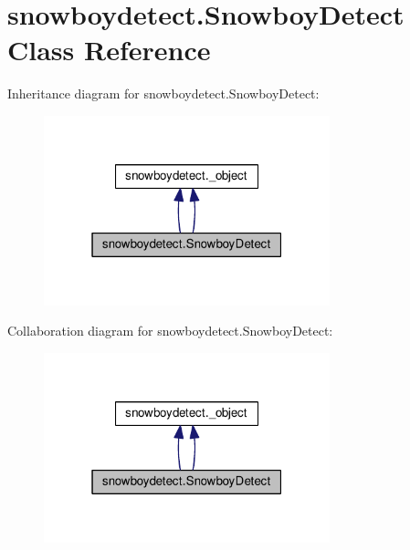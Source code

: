 \hypertarget{classsnowboydetect_1_1SnowboyDetect}{}\section{snowboydetect.\+Snowboy\+Detect Class Reference}
\label{classsnowboydetect_1_1SnowboyDetect}


Inheritance diagram for snowboydetect.\+Snowboy\+Detect\+:
\nopagebreak
\begin{figure}[H]
\begin{center}
\leavevmode
\includegraphics[width=235pt]{classsnowboydetect_1_1SnowboyDetect__inherit__graph}
\end{center}
\end{figure}


Collaboration diagram for snowboydetect.\+Snowboy\+Detect\+:
\nopagebreak
\begin{figure}[H]
\begin{center}
\leavevmode
\includegraphics[width=235pt]{classsnowboydetect_1_1SnowboyDetect__coll__graph}
\end{center}
\end{figure}
